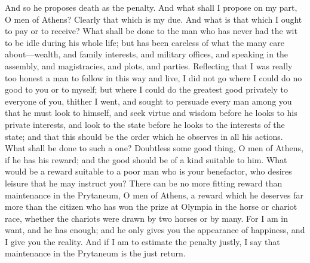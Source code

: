 \documentclass[12pt]{article}
\begin{document}
And so he proposes death as the penalty. And what shall I propose
on my part, O men of Athens? Clearly that which is my due. And what
is that which I ought to pay or to receive? What shall be done to
the man who has never had the wit to be idle during his whole life;
but has been careless of what the many care about---wealth, and family
interests, and military offices, and speaking in the assembly, and
magistracies, and plots, and parties. Reflecting that I was really
too honest a man to follow in this way and live, I did not go where
I could do no good to you or to myself; but where I could do the greatest
good privately to everyone of you, thither I went, and sought to persuade
every man among you that he must look to himself, and seek virtue
and wisdom before he looks to his private interests, and look to the
state before he looks to the interests of the state; and that this
should be the order which he observes in all his actions. What shall
be done to such a one? Doubtless some good thing, O men of Athens,
if he has his reward; and the good should be of a kind suitable to
him. What would be a reward suitable to a poor man who is your benefactor,
who desires leisure that he may instruct you? There can be no more
fitting reward than maintenance in the Prytaneum, O men of Athens,
a reward which he deserves far more than the citizen who has won the
prize at Olympia in the horse or chariot race, whether the chariots
were drawn by two horses or by many. For I am in want, and he has
enough; and he only gives you the appearance of happiness, and I give
you the reality. And if I am to estimate the penalty justly, I say
that maintenance in the Prytaneum is the just return.
\end{document}
